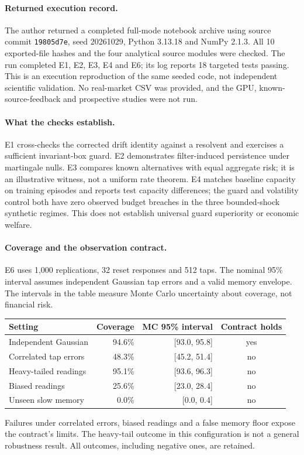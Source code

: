 \documentclass[12pt]{article}
\theoremstyle{definition}
\theoremstyle{remark}
\begin{document}
\paragraph{Returned execution record.} The author returned a completed full-mode
notebook archive using source commit \texttt{19805d7e}, seed 20261029,
Python 3.13.18 and NumPy 2.1.3. All 10 exported-file hashes and the four analytical
source modules were checked. The run completed E1, E2, E3, E4 and E6; its log
reports 18 targeted tests passing. This is an execution reproduction of the same
seeded code, not independent scientific validation. No real-market CSV was
provided, and the GPU, known-source-feedback and prospective studies were not run.

\paragraph{What the checks establish.} E1 cross-checks the corrected drift identity
against a resolvent and exercises a sufficient invariant-box guard. E2 demonstrates
filter-induced persistence under martingale nulls. E3 compares known alternatives
with equal aggregate risk; it is an illustrative witness, not a uniform rate
theorem. E4 matches baseline capacity on training episodes and reports test
capacity differences; the guard and volatility control both have zero observed
budget breaches in the three bounded-shock synthetic regimes. This does not
establish universal guard superiority or economic welfare.

\paragraph{Coverage and the observation contract.} E6 uses 1,000 replications,
32 reset responses and 512 taps. The nominal 95\% interval assumes independent
Gaussian tap errors and a valid memory envelope. The intervals in the table
measure Monte Carlo uncertainty about coverage, not financial risk.
\begin{center}\small
\begin{tabular}{lrrc}
\toprule
Setting & Coverage & MC 95\% interval & Contract holds\\
\midrule
Independent Gaussian & 94.6\% & [93.0, 95.8] & yes\\
Correlated tap errors & 48.3\% & [45.2, 51.4] & no\\
Heavy-tailed readings & 95.1\% & [93.6, 96.3] & no\\
Biased readings & 25.6\% & [23.0, 28.4] & no\\
Unseen slow memory & 0.0\% & [0.0, 0.4] & no\\
\bottomrule
\end{tabular}
\end{center}
Failures under correlated errors, biased readings and a false memory floor expose
the contract's limits. The heavy-tail outcome in this configuration is not a
general robustness result. All outcomes, including negative ones, are retained.
\end{document}
